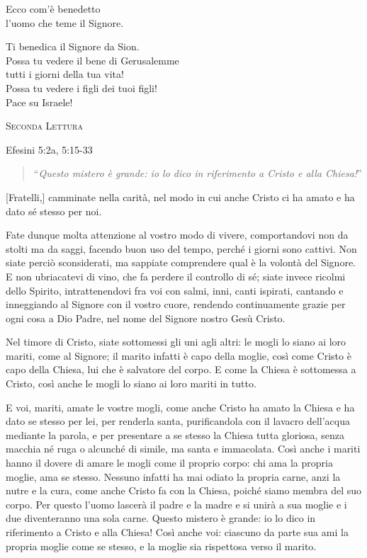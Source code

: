 \documentclass[12pt,twoside]{article}
\newcommand{\masssubpart}[1]{\bigskip

  {\large\scshape #1}}
\newcommand{\reading}[1]{#1}
\newcommand{\readingquote}[1]{
\begin{quote}
``\textit{#1}''
\end{quote}
}
\begin{document}
Ecco com'è benedetto\\
l'uomo che teme il Signore.

Ti benedica il Signore da Sion.\\
Possa tu vedere il bene di Gerusalemme\\
tutti i giorni della tua vita!\\
Possa tu vedere i figli dei tuoi figli!\\
Pace su Israele!

\masssubpart{Seconda Lettura}

\reading{Efesini 5:2a, 5:15-33}
\readingquote{Questo mistero è grande: io lo dico in riferimento a Cristo e alla Chiesa!}

[Fratelli,] camminate nella carità, nel modo in cui anche Cristo ci ha amato e ha dato sé stesso per noi.

Fate dunque molta attenzione al vostro modo di vivere, comportandovi non da stolti ma da saggi, facendo buon uso del tempo, perché i giorni sono cattivi. Non siate perciò sconsiderati, ma sappiate comprendere qual è la volontà del Signore. E non ubriacatevi di vino, che fa perdere il controllo di sé; siate invece ricolmi dello Spirito, intrattenendovi fra voi con salmi, inni, canti ispirati, cantando e inneggiando al Signore con il vostro cuore, rendendo continuamente grazie per ogni cosa a Dio Padre, nel nome del Signore nostro Gesù Cristo.

Nel timore di Cristo, siate sottomessi gli uni agli altri: le mogli lo siano ai loro mariti, come al Signore; il marito infatti è capo della moglie, così come Cristo è capo della Chiesa, lui che è salvatore del corpo. E come la Chiesa è sottomessa a Cristo, così anche le mogli lo siano ai loro mariti in tutto.

E voi, mariti, amate le vostre mogli, come anche Cristo ha amato la Chiesa e ha dato se stesso per lei, per renderla santa, purificandola con il lavacro dell'acqua mediante la parola, e per presentare a se stesso la Chiesa tutta gloriosa, senza macchia né ruga o alcunché di simile, ma santa e immacolata. Così anche i mariti hanno il dovere di amare le mogli come il proprio corpo: chi ama la propria moglie, ama se stesso. Nessuno infatti ha mai odiato la propria carne, anzi la nutre e la cura, come anche Cristo fa con la Chiesa, poiché siamo membra del suo corpo. Per questo l'uomo lascerà il padre e la madre e si unirà a sua moglie e i due diventeranno una sola carne. Questo mistero è grande: io lo dico in riferimento a Cristo e alla Chiesa! Così anche voi: ciascuno da parte sua ami la propria moglie come se stesso, e la moglie sia rispettosa verso il marito.
\end{document}
